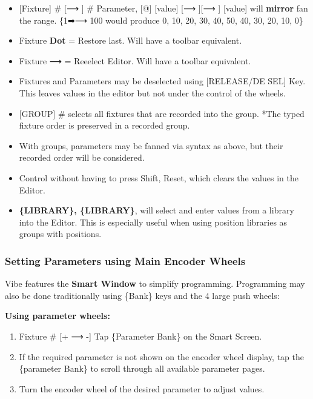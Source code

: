 \documentclass[
]{article}
\begin{document}
\begin{itemize}
\item
  {[}Fixture{]} \# {[}⟶ {]} \# Parameter, {[}@{]} {[}value{]} {[}⟶ {]}{[}⟶ {]} {[}value{]} will \textbf{mirror} fan the range. \{1➡⟶ 100 would produce 0, 10, 20, 30, 40, 50, 40, 30, 20, 10, 0\}
\item
  Fixture \textbf{Dot} = Restore last. {Will have a toolbar equivalent.}
\item
  Fixture ⟶ = Reeelect Editor. {Will have a toolbar equivalent. }
\item
  Fixtures and Parameters may be deselected using {[}RELEASE/DE SEL{]} Key. This leaves values in the editor but not under the control of the wheels.
\item
  {[}GROUP{]} \# selects all fixtures that are recorded into the group. *The typed fixture order is preserved in a recorded group.
\item
  With groups, parameters may be fanned via syntax as above, but their recorded order will be considered.
\item
  Control without having to press Shift, Reset, which clears the values in the Editor.
\item
  \textbf{\{LIBRARY\}, \{LIBRARY\}}, will select and enter values from a library into the Editor. This is especially useful when using position libraries as groups with positions.
\end{itemize}

\hypertarget{setting-parameters-using-main-encoder-wheels}{%
\subsubsection{Setting Parameters using Main Encoder Wheels}\label{setting-parameters-using-main-encoder-wheels}}

Vibe features the \textbf{Smart Window} to simplify programming. Programming may also be done traditionally using \{Bank\} keys and the 4 large push wheels:

\textbf{Using parameter wheels:}

\begin{enumerate}
\def\labelenumi{\arabic{enumi}.}
\item
  Fixture \# {[}+ ⟶ -{]} Tap \{Parameter Bank\} on the Smart Screen.
\item
  If the required parameter is not shown on the encoder wheel display, tap the \{parameter Bank\} to scroll through all available parameter pages.
\item
  Turn the encoder wheel of the desired parameter to adjust values.
\end{enumerate}
\end{document}
